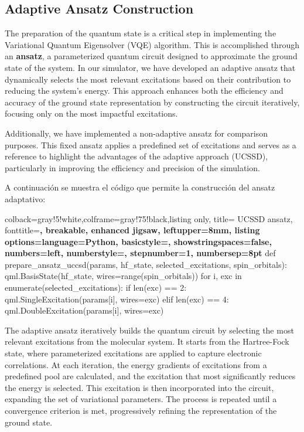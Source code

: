 \subsection{Adaptive Ansatz Construction}
The preparation of the quantum state is a critical step in implementing the Variational Quantum Eigensolver (VQE) algorithm. This is accomplished through an \textbf{ansatz}, a parameterized quantum circuit designed to approximate the ground state of the system. In our simulator, we have developed an adaptive ansatz that dynamically selects the most relevant excitations based on their contribution to reducing the system's energy. This approach enhances both the efficiency and accuracy of the ground state representation by constructing the circuit iteratively, focusing only on the most impactful excitations. 

Additionally, we have implemented a non-adaptive ansatz for comparison purposes. This fixed ansatz applies a predefined set of excitations and serves as a reference to highlight the advantages of the adaptive approach (UCSSD), particularly in improving the efficiency and precision of the simulation.

A continuación se muestra el código que permite la construcción del ansatz adaptativo:
\begin{tcblisting}{colback=gray!5!white,colframe=gray!75!black,listing only,
    title= UCSSD ansatz, fonttitle=\bfseries, breakable, enhanced jigsaw, leftupper=8mm,
    listing options={language=Python, basicstyle=\ttfamily\small,
    showstringspaces=false, numbers=left, numberstyle=\footnotesize, stepnumber=1, numbersep=8pt}}
def prepare_ansatz_uccsd(params, hf_state, selected_excitations, spin_orbitals):
qml.BasisState(hf_state, wires=range(spin_orbitals))
for i, exc in enumerate(selected_excitations):
    if len(exc) == 2:
        qml.SingleExcitation(params[i], wires=exc)
    elif len(exc) == 4:
        qml.DoubleExcitation(params[i], wires=exc)
\end{tcblisting}

The adaptive ansatz iteratively builds the quantum circuit by selecting the most relevant excitations from the molecular system. It starts from the Hartree-Fock state, where parameterized excitations are applied to capture electronic correlations. At each iteration, the energy gradients of excitations from a predefined pool are calculated, and the excitation that most significantly reduces the energy is selected. This excitation is then incorporated into the circuit, expanding the set of variational parameters. The process is repeated until a convergence criterion is met, progressively refining the representation of the ground state.

